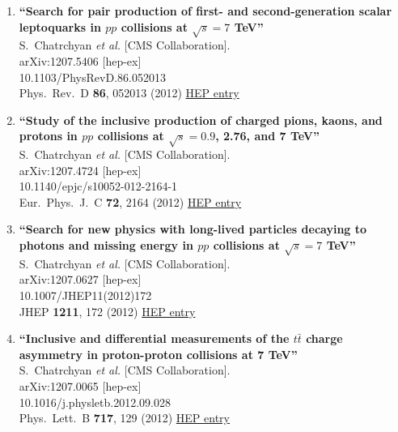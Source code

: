\documentclass{article}
\begin{document}
\begin{enumerate}
\item%
{\bf ``Search for pair production of first- and second-generation scalar leptoquarks in $pp$ collisions at $\sqrt{s}= 7$ TeV''}
  \\{}S.~Chatrchyan {\it et al.} [CMS Collaboration].
  \\{}arXiv:1207.5406 [hep-ex]
    \\{}10.1103/PhysRevD.86.052013
\\{}Phys.\ Rev.\ D {\bf 86}, 052013 (2012) %
\href{http://inspirehep.net/record/1123507}{HEP entry}


\item%
{\bf ``Study of the inclusive production of charged pions, kaons, and protons in $pp$ collisions at $\sqrt{s}=0.9$, 2.76, and 7 TeV''}
  \\{}S.~Chatrchyan {\it et al.} [CMS Collaboration].
  \\{}arXiv:1207.4724 [hep-ex]
    \\{}10.1140/epjc/s10052-012-2164-1
\\{}Eur.\ Phys.\ J.\ C {\bf 72}, 2164 (2012) %
\href{http://inspirehep.net/record/1123117}{HEP entry}


\item%
{\bf ``Search for new physics with long-lived particles decaying to photons and missing energy in $pp$ collisions at $\sqrt{s}=7$ TeV''}
  \\{}S.~Chatrchyan {\it et al.} [CMS Collaboration].
  \\{}arXiv:1207.0627 [hep-ex]
    \\{}10.1007/JHEP11(2012)172
\\{}JHEP {\bf 1211}, 172 (2012) %
\href{http://inspirehep.net/record/1120997}{HEP entry}


\item%
{\bf ``Inclusive and differential measurements of the $t \bar{t}$ charge asymmetry in proton-proton collisions at 7 TeV''}
  \\{}S.~Chatrchyan {\it et al.} [CMS Collaboration].
  \\{}arXiv:1207.0065 [hep-ex]
    \\{}10.1016/j.physletb.2012.09.028
\\{}Phys.\ Lett.\ B {\bf 717}, 129 (2012) %
\href{http://inspirehep.net/record/1120732}{HEP entry}



\end{enumerate}
\end{document}
